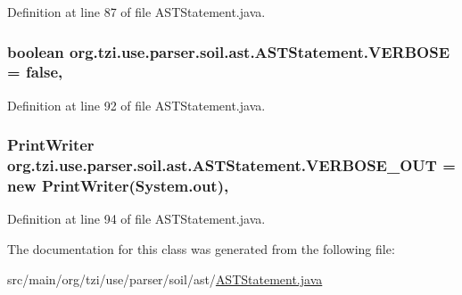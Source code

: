 Definition at line 87 of file A\-S\-T\-Statement.\-java.

\hypertarget{classorg_1_1tzi_1_1use_1_1parser_1_1soil_1_1ast_1_1_a_s_t_statement_a47c684aa3b956c5a1b5479d7769e6c8c}{
\subsubsection[{V\-E\-R\-B\-O\-S\-E}]{\setlength{\rightskip}{0pt plus 5cm}boolean org.\-tzi.\-use.\-parser.\-soil.\-ast.\-A\-S\-T\-Statement.\-V\-E\-R\-B\-O\-S\-E = false\hspace{0.3cm}{\ttfamily [static]}, {\ttfamily [protected]}}}\label{classorg_1_1tzi_1_1use_1_1parser_1_1soil_1_1ast_1_1_a_s_t_statement_a47c684aa3b956c5a1b5479d7769e6c8c}


Definition at line 92 of file A\-S\-T\-Statement.\-java.

\hypertarget{classorg_1_1tzi_1_1use_1_1parser_1_1soil_1_1ast_1_1_a_s_t_statement_a40a89b5ad699892dc55b2e01d5074386}{
\subsubsection[{V\-E\-R\-B\-O\-S\-E\-\_\-\-O\-U\-T}]{\setlength{\rightskip}{0pt plus 5cm}Print\-Writer org.\-tzi.\-use.\-parser.\-soil.\-ast.\-A\-S\-T\-Statement.\-V\-E\-R\-B\-O\-S\-E\-\_\-\-O\-U\-T = new Print\-Writer(System.\-out)\hspace{0.3cm}{\ttfamily [static]}, {\ttfamily [protected]}}}\label{classorg_1_1tzi_1_1use_1_1parser_1_1soil_1_1ast_1_1_a_s_t_statement_a40a89b5ad699892dc55b2e01d5074386}


Definition at line 94 of file A\-S\-T\-Statement.\-java.



The documentation for this class was generated from the following file\-:\begin{DoxyCompactItemize}
\item 
src/main/org/tzi/use/parser/soil/ast/\hyperlink{_a_s_t_statement_8java}{A\-S\-T\-Statement.\-java}\end{DoxyCompactItemize}
